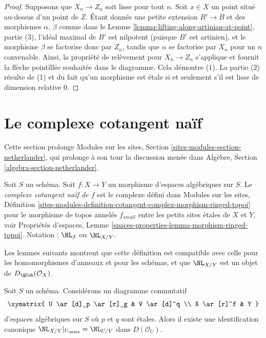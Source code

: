 \begin{proof}
Supposons que $X_n \to Z_n$ soit lisse pour tout $n$.
Soit $x \in X$ un point situé au-dessus d'un point de $Z$.
Étant donnés une petite extension $B' \to B$ et des morphismes $\alpha$, $\beta$ comme dans le
Lemme \ref{lemma-lifting-along-artinian-at-point}, partie (3),
l'idéal maximal de $B'$ est nilpotent (puisque $B'$ est artinien),
et le morphisme $\beta$ se factorise donc par $Z_n$, tandis que $\alpha$ se factorise
par $X_n$ pour un $n$ convenable. Ainsi, la propriété de relèvement pour
$X_n \to Z_n$ s'applique et fournit la flèche pointillée souhaitée dans le diagramme.
Cela démontre (1). La partie (2) résulte de (1) et du fait qu'un morphisme
est étale si et seulement s'il est lisse de dimension relative $0$.
\end{proof}











\section{Le complexe cotangent naïf}
\label{section-netherlander}

\noindent
Cette section prolonge
Modules sur les sites, Section \ref{sites-modules-section-netherlander},
qui prolonge à son tour la discussion menée dans
Algèbre, Section \ref{algebra-section-netherlander}.

\begin{definition}
\label{definition-netherlander}
Soit $S$ un schéma.
Soit $f : X \to Y$ un morphisme d'espaces algébriques sur $S$.
Le {\it complexe cotangent naïf de $f$}
est le complexe défini dans Modules sur les sites, Définition
\ref{sites-modules-definition-cotangent-complex-morphism-ringed-topoi}
pour le morphisme de topos annelés $f_{small}$ entre les
petits sites étales de $X$ et $Y$, voir
Propriétés d'espaces, Lemme
\ref{spaces-properties-lemma-morphism-ringed-topoi}.
Notation : $\NL_f$ ou $\NL_{X/Y}$.
\end{definition}

\noindent
Les lemmes suivants montrent que cette définition est compatible avec celle
pour les homomorphismes d'anneaux et pour les schémas, et que $\NL_{X/Y}$ est un
objet de $D_\QCoh(\mathcal{O}_X)$.

\begin{lemma}
\label{lemma-NL-etale-localization}
Soit $S$ un schéma. Considérons un diagramme commutatif
$$
\xymatrix{
U \ar[d]_p \ar[r]_g & V \ar[d]^q \\
X \ar[r]^f & Y
}
$$
d'espaces algébriques sur $S$ où $p$ et $q$ sont étales.
Alors il existe une identification canonique
$\NL_{X/Y}|_{U_\etale} = \NL_{U/V}$ dans $D(\mathcal{O}_U)$.
\end{lemma}

